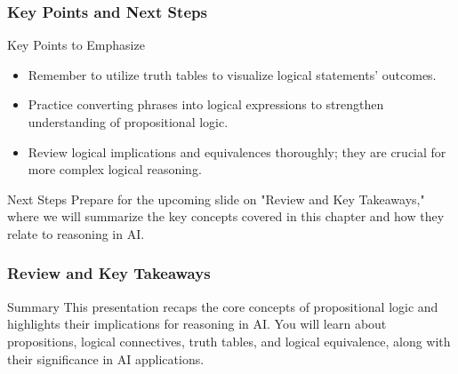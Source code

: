 \documentclass[aspectratio=169]{beamer}
\begin{document}
\begin{frame}[fragile]
    \frametitle{Key Points and Next Steps}
    \begin{block}{Key Points to Emphasize}
        \begin{itemize}
            \item Remember to utilize truth tables to visualize logical statements’ outcomes.
            \item Practice converting phrases into logical expressions to strengthen understanding of propositional logic.
            \item Review logical implications and equivalences thoroughly; they are crucial for more complex logical reasoning.
        \end{itemize}
    \end{block}
    \begin{block}{Next Steps}
        Prepare for the upcoming slide on "Review and Key Takeaways," where we will summarize the key concepts covered in this chapter and how they relate to reasoning in AI.
    \end{block}
\end{frame}

\begin{frame}[fragile]
    \frametitle{Review and Key Takeaways}
    \begin{block}{Summary}
        This presentation recaps the core concepts of propositional logic and highlights their implications for reasoning in AI. You will learn about propositions, logical connectives, truth tables, and logical equivalence, along with their significance in AI applications.
    \end{block}
\end{frame}
\end{document}

